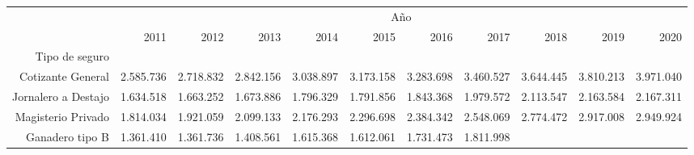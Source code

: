 \begin{tabular}{lllllllllll}
\cline{1-11}
\multicolumn{1}{c}{} &
  \multicolumn{10}{|c}{Año} \\
\multicolumn{1}{c}{} &
  \multicolumn{1}{|r}{2011} &
  \multicolumn{1}{r}{2012} &
  \multicolumn{1}{r}{2013} &
  \multicolumn{1}{r}{2014} &
  \multicolumn{1}{r}{2015} &
  \multicolumn{1}{r}{2016} &
  \multicolumn{1}{r}{2017} &
  \multicolumn{1}{r}{2018} &
  \multicolumn{1}{r}{2019} &
  \multicolumn{1}{r}{2020} \\
\cline{1-11}
\multicolumn{1}{r}{Tipo de seguro} &
  \multicolumn{1}{|r}{} &
  \multicolumn{1}{r}{} &
  \multicolumn{1}{r}{} &
  \multicolumn{1}{r}{} &
  \multicolumn{1}{r}{} &
  \multicolumn{1}{r}{} &
  \multicolumn{1}{r}{} &
  \multicolumn{1}{r}{} &
  \multicolumn{1}{r}{} &
  \multicolumn{1}{r}{} \\
\multicolumn{1}{r}{Cotizante General\hspace{1em}} &
  \multicolumn{1}{|r}{2.585.736} &
  \multicolumn{1}{r}{2.718.832} &
  \multicolumn{1}{r}{2.842.156} &
  \multicolumn{1}{r}{3.038.897} &
  \multicolumn{1}{r}{3.173.158} &
  \multicolumn{1}{r}{3.283.698} &
  \multicolumn{1}{r}{3.460.527} &
  \multicolumn{1}{r}{3.644.445} &
  \multicolumn{1}{r}{3.810.213} &
  \multicolumn{1}{r}{3.971.040} \\
\multicolumn{1}{r}{Jornalero a Destajo\hspace{1em}} &
  \multicolumn{1}{|r}{1.634.518} &
  \multicolumn{1}{r}{1.663.252} &
  \multicolumn{1}{r}{1.673.886} &
  \multicolumn{1}{r}{1.796.329} &
  \multicolumn{1}{r}{1.791.856} &
  \multicolumn{1}{r}{1.843.368} &
  \multicolumn{1}{r}{1.979.572} &
  \multicolumn{1}{r}{2.113.547} &
  \multicolumn{1}{r}{2.163.584} &
  \multicolumn{1}{r}{2.167.311} \\
\multicolumn{1}{r}{Magisterio Privado\hspace{1em}} &
  \multicolumn{1}{|r}{1.814.034} &
  \multicolumn{1}{r}{1.921.059} &
  \multicolumn{1}{r}{2.099.133} &
  \multicolumn{1}{r}{2.176.293} &
  \multicolumn{1}{r}{2.296.698} &
  \multicolumn{1}{r}{2.384.342} &
  \multicolumn{1}{r}{2.548.069} &
  \multicolumn{1}{r}{2.774.472} &
  \multicolumn{1}{r}{2.917.008} &
  \multicolumn{1}{r}{2.949.924} \\
\multicolumn{1}{r}{Ganadero tipo B\hspace{1em}} &
  \multicolumn{1}{|r}{1.361.410} &
  \multicolumn{1}{r}{1.361.736} &
  \multicolumn{1}{r}{1.408.561} &
  \multicolumn{1}{r}{1.615.368} &
  \multicolumn{1}{r}{1.612.061} &
  \multicolumn{1}{r}{1.731.473} &
  \multicolumn{1}{r}{1.811.998} &

\end{tabular}

